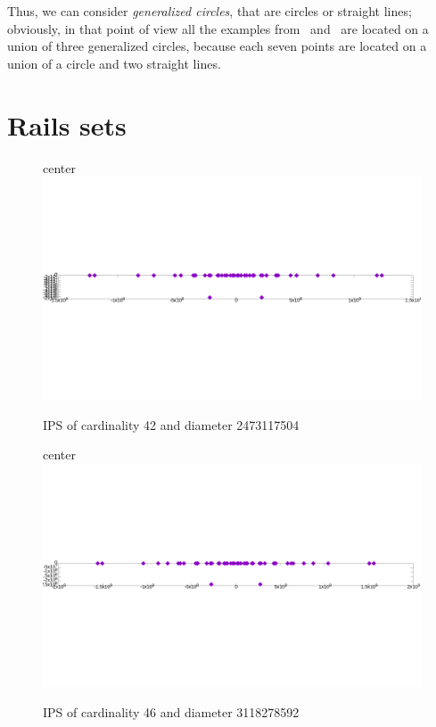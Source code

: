 \documentclass[12pt]{article}
\theoremstyle{theorem}
\theoremstyle{dfn}
\theoremstyle{remark}
\begin{document}
Thus, we can consider \emph{generalized circles}, that are circles or straight lines;
obviously, in that point of view all the examples from~\cite{kreisel2008heptagon} and~\cite{kurz2013constructing}
are located on a union of three generalized circles,
because each seven points are located on a union of a circle and two straight lines.




\section{Rails sets}




\begin{figure}[h!]
center{\includegraphics[width=1\linewidth]{./img/42_symm.png}}
\parbox{1\linewidth}{\caption{IPS of cardinality 42 and diameter 2473117504}
\label{42_symm.png}}
\end{figure}

\begin{figure}[h!]
center{\includegraphics[width=1\linewidth]{./img/46_symm.png}}
\parbox{1\linewidth}{\caption{IPS of cardinality 46 and diameter 3118278592}
\label{46_symm.png}}
\end{figure}
\end{document}
